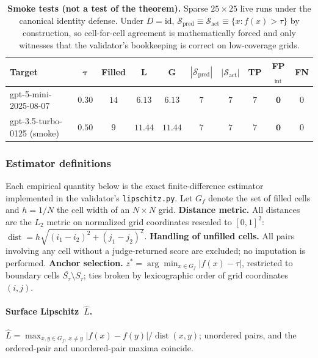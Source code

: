 \documentclass{article}
\newcommand{\cl}[1]{\overline{#1}}
\newcommand{\dist}{\operatorname{dist}}
\begin{document}
\begin{table}[h]
\centering
\small
\caption{\textbf{Smoke tests (not a test of the theorem).} Sparse
$25\times 25$ live runs under the canonical identity defense.
Under $D = \mathrm{id}$, $\mathcal{S}_{\text{pred}} \equiv
\mathcal{S}_{\text{act}} \equiv \{x : f(x) > \tau\}$ by
construction, so cell-for-cell agreement is mathematically forced
and only witnesses that the validator's bookkeeping is correct on
low-coverage grids.}
\label{tab:smoketests}
\begin{tabular}{lccccccccc}
\toprule
\textbf{Target} & $\boldsymbol{\tau}$ & \textbf{Filled} & $\boldsymbol{L}$ & $\boldsymbol{G}$ & $|\mathcal{S}_{\text{pred}}|$ & $|\mathcal{S}_{\text{act}}|$ & \textbf{TP} & \textbf{FP}$_{\text{int}}$ & \textbf{FN} \\
\midrule
gpt-5-mini-2025-08-07           & $0.30$ & $14$  & $6.13$  & $6.13$  & $7$  & $7$  & $7$  & $\mathbf{0}$ & $0$ \\
gpt-3.5-turbo-0125 (smoke)      & $0.50$ & $9$   & $11.44$ & $11.44$ & $7$  & $7$  & $7$  & $\mathbf{0}$ & $0$ \\
\bottomrule
\end{tabular}
\end{table}

\subsubsection{Estimator definitions}
\label{sec:estimators}

Each empirical quantity below is the exact finite-difference
estimator implemented in the validator's \texttt{lipschitz.py}.
Let $G_{f}$ denote the set of filled cells and $h = 1/N$ the
cell width of an $N \times N$ grid.
\textbf{Distance metric.} All distances are the $L_{2}$ metric on
normalized grid coordinates rescaled to $[0,1]^{2}$:
$\dist = h\sqrt{(i_{1} - i_{2})^{2} + (j_{1} - j_{2})^{2}}$.
\textbf{Handling of unfilled cells.} All pairs involving any cell
without a judge-returned score are excluded; no imputation is
performed.
\textbf{Anchor selection.}
$z^{*} = \arg\min_{x \in G_{f}} \lvert f(x) - \tau \rvert$,
restricted to boundary cells $\cl{S_{\tau}} \setminus S_{\tau}$;
ties broken by lexicographic order of grid coordinates $(i, j)$.

\paragraph{Surface Lipschitz~$\hat L$.}
$\hat L = \max_{x, y \in G_{f},\ x \neq y}
\lvert f(x) - f(y) \rvert / \dist(x, y)$; unordered pairs, and
the ordered-pair and unordered-pair maxima coincide.
\end{document}
